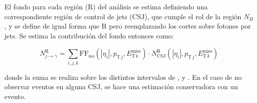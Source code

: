 El fondo para cada región (R) del análisis se estima definiendo una correspondiente región de control de jets (CSJ), que cumple el rol de la región $N_B$, y se define de igual forma que R pero reemplazando los cortes sobre fotones por jets. Se estima la contribución del fondo entonces como:


\begin{equation}
  N^{\text{R}}_{j\rightarrow\gamma} = \sum_{i,j,k} \text{FF}_{\text{iso}}(|\eta_i|, p_{\text{T}\,j}, E_{\text{T}\,k}^{\text{miss}}) \cdot N^{\text{R}}_{\mathrm{CSJ}}(|\eta_i|, p_{\text{T}\,j}, E_{\text{T}\,k}^{\text{miss}})
  \label{eq:jfake_cs}
\end{equation}

\noindent
donde la suma se realiza sobre los distintos intervalos de \absEta, \pt y \met.
En el caso de no observar eventos en alguna CSJ, se hace una estimación conservadora con un evento.



